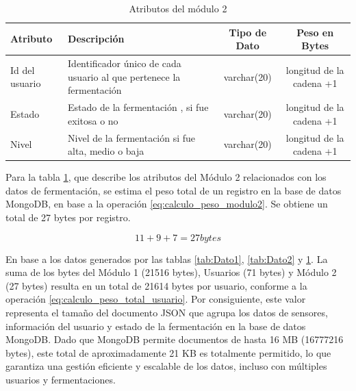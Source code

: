 \begin{table}[htbp]
    \centering
    \caption{Atributos del módulo 2} %
    \label{tab:Dato4}
    \footnotesize %

    \begin{tabular}{|>{\raggedright\arraybackslash}p{2.5cm}|>{\raggedright\arraybackslash}p{6.0cm}|c|c|}
        \hline
        \textbf{Atributo} & \textbf{Descripción} & \textbf{Tipo de Dato} & \textbf{Peso en Bytes} \\ \hline
        Id del usuario & Identificador único de cada usuario al que pertenece la fermentación & varchar(20) & longitud de la cadena +1 \\ \hline
        Estado & Estado de la fermentación , si fue exitosa o no & varchar(20) & longitud de la cadena +1 \\ \hline %
        Nivel & Nivel de la fermentación si fue alta, medio o baja & varchar(20) & longitud de la cadena +1 \\ \hline
    \end{tabular}
\end{table}

Para la tabla \ref{tab:Dato4}, que describe los atributos del Módulo 2 relacionados 
con los datos de fermentación, se estima el peso total de un registro en la base de
datos MongoDB, en base a la operación \ref{eq:calculo_peso_modulo2}. 
Se obtiene 
un total de 27 bytes por registro. 

\begin{equation}
11 + 9 + 7 = 27 bytes
\label{eq:calculo_peso_modulo2}
\end{equation}

En base a los datos generados por 
las tablas \ref{tab:Dato1}, 
\ref{tab:Dato2} y \ref{tab:Dato4}. La suma de los bytes del Módulo 1 (21516 bytes),
Usuarios (71 bytes) y Módulo 2 (27 bytes) resulta en un total de 21614 bytes por 
usuario, conforme a la operación \ref{eq:calculo_peso_total_usuario}. Por consiguiente, 
este valor representa el tamaño del documento JSON que agrupa los datos de sensores,
información del usuario y estado de la fermentación en la base de datos MongoDB. 
Dado que MongoDB permite documentos de hasta 16 MB (16777216 bytes), 
este total de aproximadamente 21 KB es totalmente permitido, 
lo que garantiza una gestión eficiente y escalable de los datos,
incluso con múltiples usuarios y fermentaciones.

